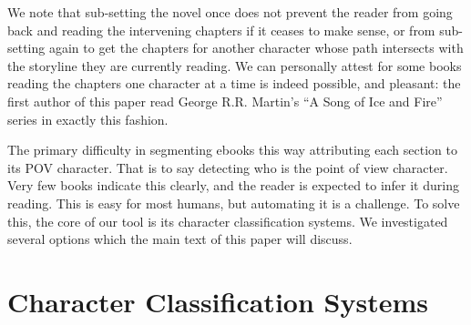 \documentclass[11pt,a4paper]{article}
\begin{document}
We note that sub-setting the novel once does not prevent the reader from going back and reading the intervening chapters if it ceases to make sense, or from sub-setting again to get the chapters for another character whose path intersects with the storyline they are currently reading.
We can personally attest for some books reading the chapters one character at a time is indeed possible, and pleasant: the first author of this paper read George R.R. Martin's ``A Song of Ice and Fire'' series in exactly this fashion.


The primary difficulty in segmenting ebooks this way attributing each section to its POV character.
That is to say detecting who is the point of view character.
Very few books indicate this clearly, and the reader is expected to infer it during reading.
This is easy for most humans, but automating it is a challenge.
To solve this, the core of our tool is its character classification systems.
We investigated several options which the main text of this paper will discuss.


\section{Character Classification Systems}
\end{document}

